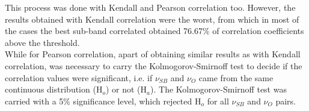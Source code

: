This process was done with Kendall and Pearson correlation too. However, the results obtained with Kendall correlation were the worst, from which in most of the cases the best sub-band correlated obtained 76.67\% of correlation coefficients above the threshold.\\

While for Pearson correlation, apart of obtaining similar results as with Kendall correlation, was necessary to carry the Kolmogorov-Smirnoff test to decide if the correlation values were significant, i.e. if $ \nu_{SB} $ and \small$ \nu_{O }$ came from the same continuous distribution (H$ _{o} $) or not (H$ _{a} $). The Kolmogorov-Smirnoff test was carried with a 5\% significance level, which rejected H$ _{o} $ for all $ \nu_{SB} $ and \small$ \nu_{O }$ pairs.\\

